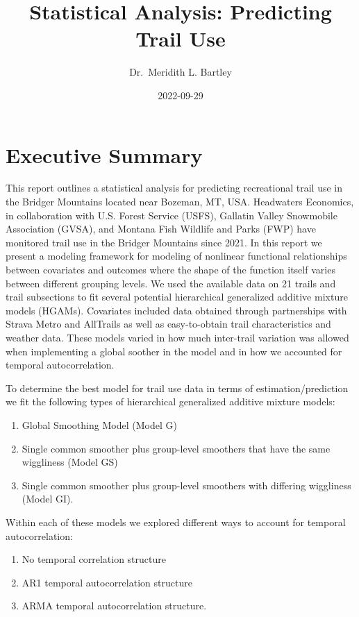 \documentclass[
]{book}
\title{Statistical Analysis: Predicting Trail Use}
\author{Dr.~Meridith L. Bartley}
\date{2022-09-29}
\providecommand{\tightlist}{%
  \setlength{\itemsep}{0pt}\setlength{\parskip}{0pt}}
\begin{document}
\maketitle

{
\setcounter{tocdepth}{1}
\tableofcontents
}
\hypertarget{executive-summary}{%
\chapter{Executive Summary}\label{executive-summary}}

This report outlines a statistical analysis for predicting recreational trail use in the Bridger Mountains located near Bozeman, MT, USA. Headwaters Economics, in collaboration with U.S. Forest Service (USFS), Gallatin Valley Snowmobile Association (GVSA), and Montana Fish Wildlife and Parks (FWP) have monitored trail use in the Bridger Mountains since 2021. In this report we present a modeling framework for modeling of nonlinear functional relationships between covariates and outcomes where the shape of the function itself varies between different grouping levels. We used the available data on 21 trails and trail subsections to fit several potential hierarchical generalized additive mixture models (HGAMs). Covariates included data obtained through partnerships with Strava Metro and AllTrails as well as easy-to-obtain trail characteristics and weather data. These models varied in how much inter-trail variation was allowed when implementing a global soother in the model and in how we accounted for temporal autocorrelation.

To determine the best model for trail use data in terms of estimation/prediction we fit the following types of hierarchical generalized additive mixture models:

\begin{enumerate}
\def\labelenumi{\arabic{enumi}.}
\tightlist
\item
  Global Smoothing Model (Model G)
\item
  Single common smoother plus group-level smoothers that have the same wiggliness (Model GS)
\item
  Single common smoother plus group-level smoothers with differing wiggliness (Model GI).
\end{enumerate}

Within each of these models we explored different ways to account for temporal autocorrelation:

\begin{enumerate}
\def\labelenumi{\arabic{enumi}.}
\tightlist
\item
  No temporal correlation structure
\item
  AR1 temporal autocorrelation structure
\item
  ARMA temporal autocorrelation structure.
\end{enumerate}
\end{document}
